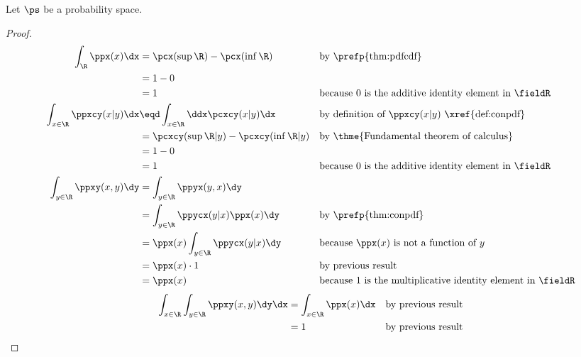 \begin{theorem}
\label{thm:pdf1}
Let $\ps$ be a probability space.
\end{theorem}
\begin{proof}
\begin{align*}
  \int_{\R} \ppx(x) \dx
    &= \pcx(\sup\R) - \pcx(\inf\R)
    && \text{by \prefp{thm:pdfcdf}}
  \\&= 1 - 0
  \\&= 1
    && \text{because $0$ is the additive identity element in $\fieldR$}
  \\
  \int_{x\in\R} \ppxcy(x|y) \dx
    &\eqd \int_{x\in\R} \ddx\pcxcy(x|y) \dx
    &&    \text{by definition of $\ppxcy(x|y)$ \xref{def:conpdf}}
  \\&=    \pcxcy(\sup\R|y) - \pcxcy(\inf\R|y)
    &&    \text{by \thme{Fundamental theorem of calculus}}
  \\&=    1-0
  \\&=    1
    && \text{because $0$ is the additive identity element in $\fieldR$}
  \\
  \int_{y\in\R} \ppxy(x,y) \dy
    &= \int_{y\in\R} \ppyx(y,x) \dy
  \\&= \int_{y\in\R} \ppycx(y|x)\ppx(x) \dy  && \text{by \prefp{thm:conpdf}}
  \\&= \ppx(x)\int_{y\in\R} \ppycx(y|x) \dy  && \text{because $\ppx(x)$ is not a function of $y$}
  \\&= \ppx(x)\cdot1                         && \text{by previous result}
  \\&= \ppx(x)                               && \text{because $1$ is the multiplicative identity element in $\fieldR$}
\end{align*}
\begin{align*}
  \int_{x\in\R}\int_{y\in\R} \ppxy(x,y) \dy\dx
    &= \int_{x\in\R}\ppx(x)\dx               && \text{by previous result}
  \\&= 1                                     && \text{by previous result}
\end{align*}
\end{proof}

